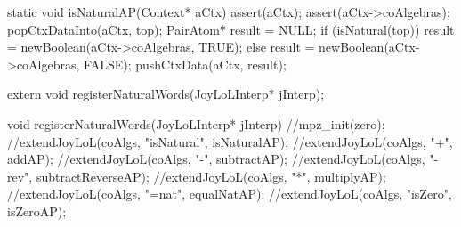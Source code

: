 static void isNaturalAP(Context* aCtx) {
  assert(aCtx);
  assert(aCtx->coAlgebras);
  popCtxDataInto(aCtx, top);
  PairAtom* result = NULL;
  if (isNatural(top)) result = newBoolean(aCtx->coAlgebras, TRUE);
  else                result = newBoolean(aCtx->coAlgebras, FALSE);
  pushCtxData(aCtx, result);
}
\stoptyping

\startCHeader
extern void registerNaturalWords(JoyLoLInterp* jInterp);
\stopCHeader
{}

\startCCode
void registerNaturalWords(JoyLoLInterp* jInterp) {
  //mpz_init(zero);
  //extendJoyLoL(coAlgs, "isNatural", isNaturalAP);
  //extendJoyLoL(coAlgs, "+",         addAP);
  //extendJoyLoL(coAlgs, "-",         subtractAP);
  //extendJoyLoL(coAlgs, "-rev",      subtractReverseAP);
  //extendJoyLoL(coAlgs, "*",         multiplyAP);
  //extendJoyLoL(coAlgs, "=nat",      equalNatAP);
  //extendJoyLoL(coAlgs, "isZero",    isZeroAP);
}
\stopCCode
